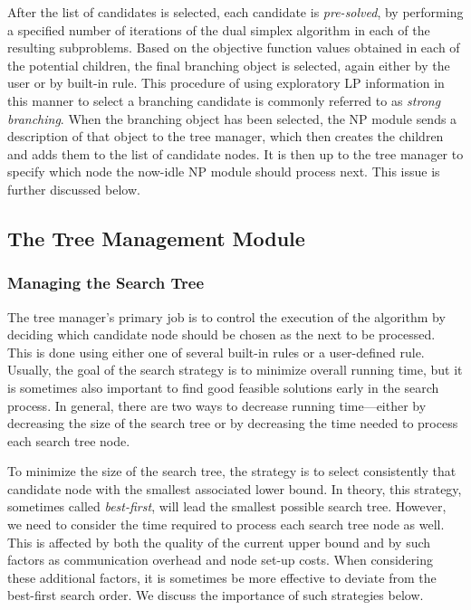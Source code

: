After the list of candidates is selected, each candidate is {\em
pre-solved}, by performing a specified number of iterations of the
dual simplex algorithm in each of the resulting subproblems. Based on
the objective function values obtained in each of the potential
children, the final branching object is selected, again either by the
user or by built-in rule. This procedure of using exploratory LP
information in this manner to select a branching candidate is commonly
referred to as {\em strong branching}. When the branching object has
been selected, the NP module sends a description of that object to the
tree manager, which then creates the children and adds them to the
list of candidate nodes. It is then up to the tree manager to specify
which node the now-idle NP module should process next. This issue is
further discussed below.

\subsection{The Tree Management Module}
\label{tree-management}

\subsubsection{Managing the Search Tree}

The tree manager's primary job is to control the execution of the
algorithm by deciding which candidate node should be chosen as the
next to be processed. This is done using either one of several
built-in rules or a user-defined rule. Usually, the goal of the search
strategy is to minimize overall running time, but it is sometimes
also important to find good feasible solutions early in the search
process. In general, there are two ways to decrease running
time---either by decreasing the size of the search tree or by
decreasing the time needed to process each search tree node.

To minimize the size of the search tree, the strategy is to select
consistently that candidate node with the smallest associated lower bound.
In theory, this strategy, sometimes called {\em best-first}, will lead
the smallest possible search tree. However, we need to consider the
time required to process each search tree node as well. This is affected
by both the quality of the current upper bound and by such factors as
communication overhead and node set-up costs. When considering these
additional factors, it is sometimes be more effective to deviate from the
best-first search order. We discuss the importance of such strategies
below.

